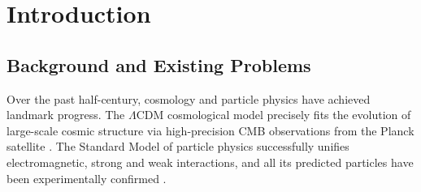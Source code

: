 \documentclass[12pt,a4paper]{article}
\begin{document}
\begin{abstract}
This work presents a set of testable observational predictions together with a full suite of first-order phenomenological dynamical equations, guiding future quantitative validation and discriminative experiments. This programme is an ontological unified framework and does not negate the computational validity of existing physical theories within their respective domains. It aims to connect microscopic, macroscopic and cosmological scales with fewer independent ad-hoc postulates.

This version is an open discussion draft (v0.1 revised). Some equations are phenomenological placeholders; their parameters and asymptotic behaviours will be refined in subsequent revisions. Revisions and discussion materials are hosted in an open-source repository:
\url{https://github.com/nell332/transdimensional-cosmology-program.git}, with version records archived on Zenodo:
\url{https://doi.org/10.5281/zenodo.23765255}.

\textbf{Keywords}: transdimensional dynamics; cosmic origin; mass–energy conversion; quantum entanglement; dark-matter effects; dimensional interface tension
\end{abstract}

\section{Introduction}
\subsection{Background and Existing Problems}
Over the past half-century, cosmology and particle physics have achieved landmark progress. The $\Lambda$CDM cosmological model precisely fits the evolution of large-scale cosmic structure via high-precision CMB observations from the Planck satellite \cite{planck2018}. The Standard Model of particle physics successfully unifies electromagnetic, strong and weak interactions, and all its predicted particles have been experimentally confirmed \cite{oerter2006}.
\end{document}
